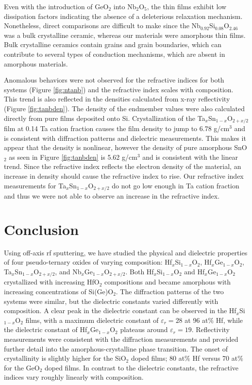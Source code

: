 Even with the introduction of GeO$_{2}$ into Nb$_{2}$O$_{5}$, the thin films exhibit low dissipation factors indicating the absence of a deleterious relaxation mechanism. Nonetheless, direct comparisons are difficult to make since the Nb$_{0.92}$Si$_{0.08}$O$_{2.46}$ was a bulk crystalline ceramic, whereas our materials were amorphous thin films. Bulk crystalline ceramics contain grains and grain boundaries, which can contribute to several types of conduction mechanisms, which are absent in amorphous materials. 
     
Anomalous behaviors were not observed for the refractive indices for both systems (Figure \ref{fig:ntanb}) and the refractive index scales with composition. This trend is also reflected in the densities calculated from x-ray reflectivity (Figure \ref{fig:tanbden}). The density of the endmember values were also calculated directly from pure films deposited onto Si. Crystallization of the Ta$_{x}$Sn$_{1-x}$O$_{2+x/2}$ film at 0.14 Ta cation fraction causes the film density to jump to 6.78 g/cm$^{3}$ and is consistent with diffraction patterns and dielectric measurements. This makes it appear that the density is nonlinear, however the density of pure amorphous SnO$_{2}$ as seen in Figure \ref{fig:tanbden} is 5.62 g/cm$^{3}$ and is consistent with the linear trend. Since the refractive index reflects the electron density of the material, an increase in density should cause the refractive index to rise. Our refractive index measurements for Ta$_{x}$Sn$_{1-x}$O$_{2+x/2}$ do not go low enough in Ta cation fraction and thus we were not able to observe an increase in the refractive index. 

\section{Conclusion}

Using off-axis rf sputtering, we have studied the physical and dielectric properties of four pseudo-ternary oxides of varying composition: Hf$_{x}$Si$_{1-x}$O$_{2}$, Hf$_{x}$Ge$_{1-x}$O$_{2}$, Ta$_{x}$Sn$_{1-x}$O$_{2+x/2}$, and Nb$_{x}$Ge$_{1-x}$O$_{2+x/2}$. Both Hf$_{x}$Si$_{1-x}$O$_{2}$ and Hf$_{x}$Ge$_{1-x}$O$_{2}$ crystallized with increasing HfO$_{2}$ compositions and became amorphous with increasing concentrations of Si(Ge)O$_{2}$. The diffraction patterns of the two systems were similar, but the dielectric constants varied differently with composition. A clear peak in the dielectric constant can be observed in the Hf$_{x}$Si$_{1-x}$O$_{2}$ films, with a maximum dielectric constant of $\varepsilon_{r} = 28$ at 96 at$\%$ Hf, while the dielectric constant of Hf$_{x}$Ge$_{1-x}$O$_{2}$ plateaus around $\varepsilon_{r} = 19$. Reflectivity measurements were consistent with the diffraction measurements and provided further detail into the amorphous-crystalline phase transition. The onset of crystallinity is slightly higher for the SiO$_{2}$ doped films; 80 at$\%$ Hf versus 70 at$\%$ for the GeO$_{2}$ doped films. In contrast to the dielectric constants, the refractive indices vary roughly linearly with composition.


